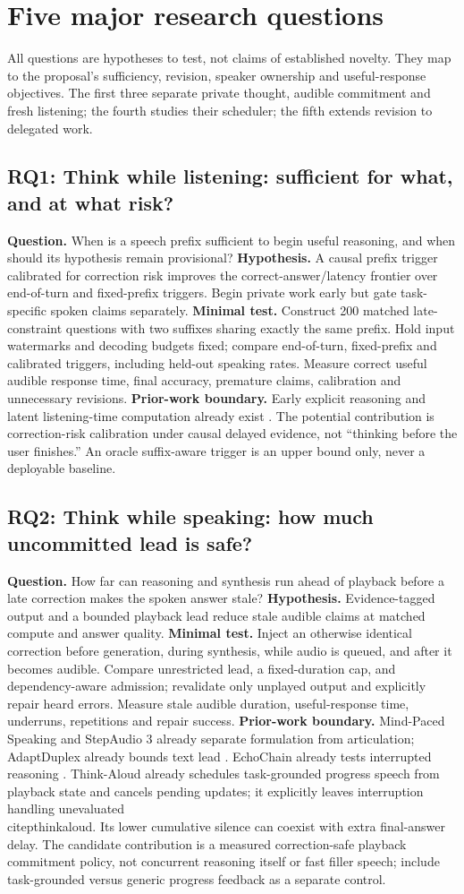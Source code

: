 \documentclass{article}
\newcommand{\researchquestion}[2]{\subsection{#1: #2}}
\begin{document}
\section{Five major research questions}
\label{sec:questions}
All questions are hypotheses to test, not claims of established novelty. They map to the proposal's sufficiency, revision, speaker ownership and useful-response objectives. The first three separate private thought, audible commitment and fresh listening; the fourth studies their scheduler; the fifth extends revision to delegated work.

\researchquestion{RQ1}{Think while listening: sufficient for what, and at what risk?}
\textbf{Question.} When is a speech prefix sufficient to begin useful reasoning, and when should its hypothesis remain provisional? \textbf{Hypothesis.} A causal prefix trigger calibrated for correction risk improves the correct-answer/latency frontier over end-of-turn and fixed-prefix triggers. Begin private work early but gate task-specific spoken claims separately. \textbf{Minimal test.} Construct 200 matched late-constraint questions with two suffixes sharing exactly the same prefix. Hold input watermarks and decoding budgets fixed; compare end-of-turn, fixed-prefix and calibrated triggers, including held-out speaking rates. Measure correct useful audible response time, final accuracy, premature claims, calibration and unnecessary revisions. \textbf{Prior-work boundary.} Early explicit reasoning and latent listening-time computation already exist \citep{thinklisten,flair}. The potential contribution is correction-risk calibration under causal delayed evidence, not ``thinking before the user finishes.'' An oracle suffix-aware trigger is an upper bound only, never a deployable baseline.

\researchquestion{RQ2}{Think while speaking: how much uncommitted lead is safe?}
\textbf{Question.} How far can reasoning and synthesis run ahead of playback before a late correction makes the spoken answer stale? \textbf{Hypothesis.} Evidence-tagged output and a bounded playback lead reduce stale audible claims at matched compute and answer quality. \textbf{Minimal test.} Inject an otherwise identical correction before generation, during synthesis, while audio is queued, and after it becomes audible. Compare unrestricted lead, a fixed-duration cap, and dependency-aware admission; revalidate only unplayed output and explicitly repair heard errors. Measure stale audible duration, useful-response time, underruns, repetitions and repair success. \textbf{Prior-work boundary.} Mind-Paced Speaking and StepAudio 3 already separate formulation from articulation; AdaptDuplex already bounds text lead \citep{mindpaced,step3,adapt}. EchoChain already tests interrupted reasoning \citep{echochain}. Think-Aloud already schedules task-grounded progress speech from playback state and cancels pending updates; it explicitly leaves interruption handling unevaluated \\citep{thinkaloud}. Its lower cumulative silence can coexist with extra final-answer delay. The candidate contribution is a measured correction-safe playback commitment policy, not concurrent reasoning itself or fast filler speech; include task-grounded versus generic progress feedback as a separate control.
\end{document}
